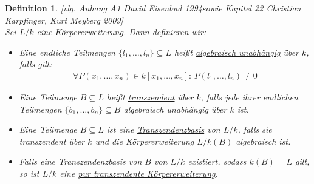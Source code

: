 \documentclass[10pt,a4paper]{report}
\newcommand{\ModulsOfDifferenzials}{David Eisenbud 1994}
\newcommand{\Algebra}{Christian Karpfinger, Kurt Meyberg 2009}
\newcounter{Aussage}[chapter]
\newtheorem{definition}[Aussage]{Definition}
\begin{document}
\begin{definition}\label{Definition Transzendenzbasis}\textit{[vlg. Anhang A1 \ModulsOfDifferenzials sowie Kapitel 22 \Algebra]}\\
Sei $L/k$ eine Körpererweiterung. Dann definieren wir:
\begin{itemize}
\item[•] Eine endliche Teilmengen $\lbrace l_1, \dots ,l_n \rbrace \subseteq L$ heißt \underline{algebraisch unabhängig} über $k$, falls gilt:
\begin{gather*}
\forall P(x_1, \dots , x_n) \in k[x_1,\dots,x_n] : \, P(l_1, \dots , l_n) \neq 0
\end{gather*}
\item[•] Eine Teilmenge $B \subseteq L$ heißt \underline{transzendent} über $k$, falls jede ihrer endlichen Teilmengen $\lbrace b_1, \dots , b_n \rbrace \subseteq B$ algebraisch unabhängig über $k$ ist.
\item[•] Eine Teilmenge $B \subseteq L$ ist eine \underline{Transzendenzbasis} von $L/k$, falls sie transzendent über $k$ und die Körpererweiterung $L/k(B)$ algebraisch ist.
\item[•] Falls eine Transzendenzbasis von $B$ von $L/k$ existiert, sodass $k(B) = L$ gilt, so ist $L/k$ eine \underline{pur transzendente Körpererweiterung}.
\end{itemize}
\end{definition}
\end{document}
